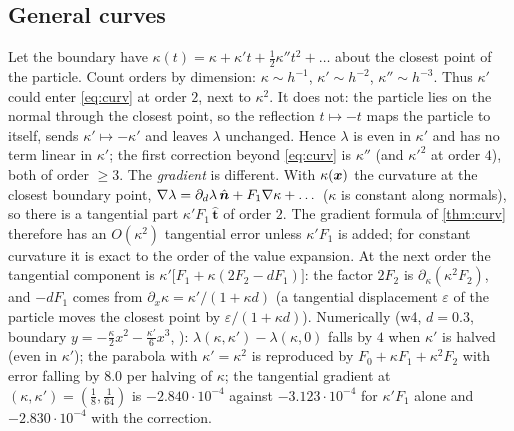 \subsection{General curves}
\begin{remark}\label{rem:varcurv}
Let the boundary have $\kappa(t)=\kappa+\kappa't+\tfrac12\kappa''t^2+\dots$ about the closest point of the particle. Count orders by dimension:
$\kappa\sim h^{-1}$, $\kappa'\sim h^{-2}$, $\kappa''\sim h^{-3}$. Thus $\kappa'$ could enter \cref{eq:curv} at order $2$, next to $\kappa^2$.
It does not: the particle lies on the normal through the closest point, so the reflection $t\mapsto-t$ maps the particle to itself, sends $\kappa'\mapsto-\kappa'$ and
leaves $\lambda$ unchanged. Hence $\lambda$ is even in $\kappa'$ and has no term linear in $\kappa'$; the first correction beyond \cref{eq:curv} is $\kappa''$ (and
$\kappa'^2$ at order $4$), both of order $\ge3$. 
The \emph{gradient} is different. With $\kappa(\bm x)$ the curvature at the closest boundary point, $\nabla\lambda=\partial_d\lambda\,\hat{\bm n}+F_1\nabla\kappa+\dots$
($\kappa$ is constant along normals), so there is a tangential part $\kappa'F_1\,\hat{\bm t}$ of order $2$. The gradient formula of \cref{thm:curv}
therefore has an $O(\kappa^2)$ tangential error unless $\kappa'F_1$ is added; for constant curvature it is exact to the order of the value expansion. At the next order the
tangential component is $\kappa'\big[F_1+\kappa(2F_2-dF_1)\big]$: the factor $2F_2$ is $\partial_\kappa(\kappa^2F_2)$, and $-dF_1$ comes from $\partial_x\kappa=\kappa'/(1+\kappa d)$ (a tangential
displacement $\varepsilon$ of the particle moves the closest point by $\varepsilon/(1+\kappa d)$). 
Numerically (w4, $d=0.3$, boundary $y=-\frac\kappa2x^2-\frac{\kappa'}6x^3$, ): $\lambda(\kappa,\kappa')-\lambda(\kappa,0)$ falls by $4$ when $\kappa'$ is halved (even in $\kappa'$);
the parabola with $\kappa'=\kappa^2$ is reproduced by $F_0+\kappa F_1+\kappa^2F_2$ with error falling by $8.0$ per halving of $\kappa$; the tangential gradient at $(\kappa,\kappa')=(\frac18,\frac1{64})$ is
$-2.840\cdot10^{-4}$ against $-3.123\cdot10^{-4}$ for $\kappa'F_1$ alone and $-2.830\cdot10^{-4}$ with the correction.
\end{remark}

